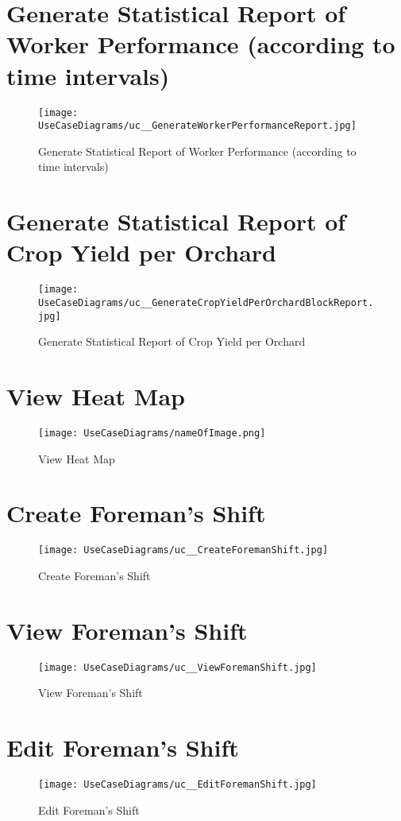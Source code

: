\documentclass[11pt,fleqn]{book} %
\begin{document}
	\section{Generate Statistical Report of Worker Performance (according to time intervals)}
	\begin{figure}
		\texttt{[image: UseCaseDiagrams/uc\_\_GenerateWorkerPerformanceReport.jpg]}
		\caption{Generate Statistical Report of Worker Performance (according to time intervals)}
	\end{figure}
	
	\section{Generate Statistical Report of Crop Yield per Orchard}
	\begin{figure}
		\texttt{[image: UseCaseDiagrams/uc\_\_GenerateCropYieldPerOrchardBlockReport.jpg]}
		\caption{Generate Statistical Report of Crop Yield per Orchard}
	\end{figure}
	
	\section{View Heat Map}
	\begin{figure}
		\texttt{[image: UseCaseDiagrams/nameOfImage.png]}
		\caption{View Heat Map}
	\end{figure}
	
	\section{Create Foreman’s Shift}
	\begin{figure}
		\texttt{[image: UseCaseDiagrams/uc\_\_CreateForemanShift.jpg]}
		\caption{Create Foreman’s Shift}
	\end{figure}
	
	\section{View Foreman’s Shift}
	\begin{figure}
		\texttt{[image: UseCaseDiagrams/uc\_\_ViewForemanShift.jpg]}
		\caption{View Foreman’s Shift}
	\end{figure}
	
	\section{Edit Foreman’s Shift}
	\begin{figure}
		\texttt{[image: UseCaseDiagrams/uc\_\_EditForemanShift.jpg]}
		\caption{Edit Foreman’s Shift}
	\end{figure}
	
\end{document}
